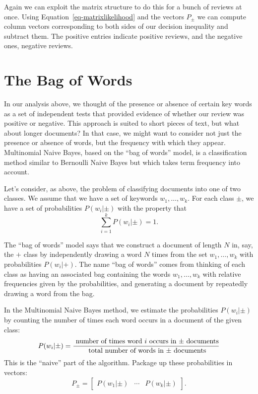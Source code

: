 \documentclass[
  11pt,
  letterpaper,
]{scrbook}
\theoremstyle{plain}
\theoremstyle{remark}
\begin{document}
Again we can exploit the matrix structure to do this for a bunch of
reviews at once. Using Equation~\ref{eq-matrixlikelihood} and the
vectors \(P_{\pm}\) we can compute column vectors corresponding to both
sides of our decision inequality and subtract them. The positive entries
indicate positive reviews, and the negative ones, negative reviews.

\hypertarget{the-bag-of-words}{%
\section{The Bag of Words}\label{the-bag-of-words}}

In our analysis above, we thought of the presence or absence of certain
key words as a set of independent tests that provided evidence of
whether our review was positive or negative. This approach is suited to
short pieces of text, but what about longer documents? In that case, we
might want to consider not just the presence or absence of words, but
the frequency with which they appear. Multinomial Naive Bayes, based on
the ``bag of words'' model, is a classification method similar to
Bernoulli Naive Bayes but which takes term frequency into account.

Let's consider, as above, the problem of classifying documents into one
of two classes. We assume that we have a set of keywords
\(w_1,\ldots, w_k\). For each class \(\pm\), we have a set of
probabilities \(P(w_i|\pm)\) with the property that \[
\sum_{i=1}^{k}P(w_{i}|\pm)=1.
\]

The ``bag of words'' model says that we construct a document of length
\(N\) in, say, the \(+\) class by independently drawing a word \(N\)
times from the set \(w_1,\ldots, w_k\) with probabilities
\(P(w_{i}|+)\). The name ``bag of words'' comes from thinking of each
class as having an associated bag containing the words
\(w_1,\ldots, w_k\) with relative frequencies given by the
probabilities, and generating a document by repeatedly drawing a word
from the bag.

In the Multinomial Naive Bayes method, we estimate the probabilities
\(P(w_{i}|\pm)\) by counting the number of times each word occurs in a
document of the given class: \[
P(w_{i}|\pm) = \frac{\hbox{ number of times word $i$ occurs in $\pm$ documents}}{\hbox{ total number of words in $\pm$ documents}}
\] This is the ``naive'' part of the algorithm. Package up these
probabilities in vectors: \[
P_{\pm} = \left[\begin{array}{ccc} P(w_{1}|\pm) & \cdots & P(w_{k}|\pm)\end{array}\right].
\]
\end{document}
